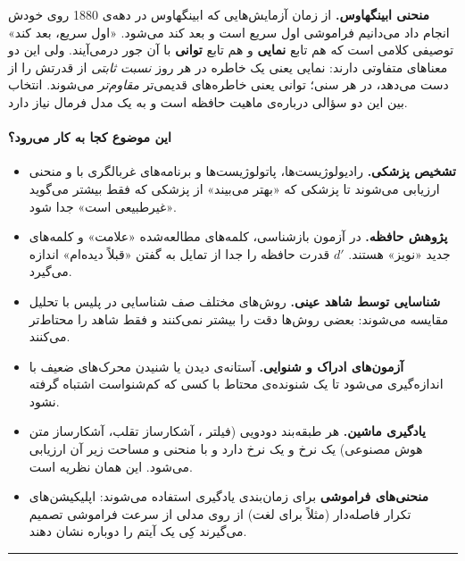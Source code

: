 \textbf{منحنی ابینگهاوس.} از زمان آزمایش‌هایی که ابینگهاوس در دهه‌ی 1880
روی خودش انجام داد می‌دانیم فراموشی اول سریع است و بعد کند می‌شود. «اول
سریع، بعد کند» توصیفی کلامی است که هم تابع \textbf{نمایی} و هم تابع
\textbf{توانی} با آن جور درمی‌آیند. ولی این دو معناهای متفاوتی دارند:
نمایی یعنی یک خاطره در هر روز \emph{نسبت ثابتی} از قدرتش را از دست
می‌دهد، در هر سنی؛ توانی یعنی خاطره‌های قدیمی‌تر \emph{مقاوم‌تر} می‌شوند.
انتخاب بین این دو سؤالی درباره‌ی ماهیت حافظه است و به یک مدل فرمال نیاز
دارد.

\paragraph{این موضوع کجا به کار می‌رود؟}

\begin{itemize}
\tightlist
\item
  \textbf{تشخیص پزشکی.} رادیولوژیست‌ها، پاتولوژیست‌ها و برنامه‌های غربالگری
  با  و منحنی  ارزیابی می‌شوند تا پزشکی که «بهتر می‌بیند»
  از پزشکی که فقط بیشتر می‌گوید «غیرطبیعی است» جدا شود.
\item
  \textbf{پژوهش حافظه.} در آزمون بازشناسی، کلمه‌های مطالعه‌شده «علامت» و
  کلمه‌های جدید «نویز» هستند. \(d'\) قدرت حافظه را جدا از تمایل به گفتن
  «قبلاً دیده‌ام» اندازه می‌گیرد.
\item
  \textbf{شناسایی توسط شاهد عینی.} روش‌های مختلف صف شناسایی
   در پلیس با تحلیل  مقایسه می‌شوند: بعضی روش‌ها دقت
  را بیشتر نمی‌کنند و فقط شاهد را محتاط‌تر می‌کنند.
\item
  \textbf{آزمون‌های ادراک و شنوایی.} آستانه‌ی دیدن یا شنیدن محرک‌های ضعیف
  با  اندازه‌گیری می‌شود تا یک شنونده‌ی محتاط با کسی که کم‌شنواست
  اشتباه گرفته نشود.
\item
  \textbf{یادگیری ماشین.} هر طبقه‌بند دودویی (فیلتر ، آشکارساز
  تقلب، آشکارساز متن هوش مصنوعی) یک نرخ  و یک نرخ  دارد و با منحنی  و مساحت زیر آن  ارزیابی
  می‌شود. این همان نظریه است.
\item
  \textbf{منحنی‌های فراموشی} برای زمان‌بندی یادگیری استفاده می‌شوند:
  اپلیکیشن‌های تکرار فاصله‌دار (مثلاً برای لغت) از روی مدلی از سرعت فراموشی
  تصمیم می‌گیرند کِی یک آیتم را دوباره نشان دهند.
\end{itemize}

\begin{center}\rule{0.5\linewidth}{0.5pt}\end{center}


